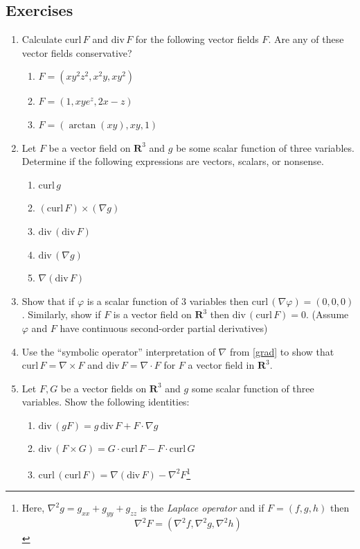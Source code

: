 \documentclass[12pt]{article}
\numberwithin{equation}{subsection}
\numberwithin{figure}{subsection}
\theoremstyle{note}
\newcommand{\curl}{\mathrm{curl\,}}
\newcommand{\dv}{\mathrm{div\,}}
\begin{document}
{\subsection{Exercises}
\begin{enumerate}[label=\arabic*.]


\item Calculate $\curl F$ and $\dv F$ for the following vector fields $F$. Are any of these vector fields conservative?

\begin{enumerate}
	\item $F=(xy^2z^2, x^2y, xy^2)$
	\item $F=(1, xye^z, 2x-z)$
	\item $F=(\arctan(xy), xy, 1)$
\end{enumerate}

\item Let $F$ be a vector field on $\mathbf{R}^3$ and $g$ be some scalar function of three variables. Determine if the following expressions are vectors, scalars, or nonsense. 

\begin{enumerate}
	\item $\curl g$
	\item $(\curl F) \times (\nabla g)$
	\item $\dv (\dv F)$
	\item $\dv (\nabla g)$
	\item $\nabla(\dv F)$
	\end{enumerate}
	
	\item Show that if $\varphi$ is a scalar function of $3$ variables then $\curl(\nabla \varphi)=(0,0,0)$. Similarly, show if $F$ is a vector field on $\mathbf{R}^3$ then $\dv(\curl F)=0$. (Assume $\varphi$ and $F$ have continuous second-order partial derivatives)

\item Use the ``symbolic operator'' interpretation of $\nabla$ from \eqref{grad} to show that $\curl F= \nabla \times F$ and $\dv F= \nabla \cdot F$ for $F$ a vector field in $\mathbf{R}^3$.

\item  Let $F,G$ be a vector fields on $\mathbf{R}^3$ and $g$ some scalar function of three variables. Show the following identities:

\begin{enumerate}
	\item $\dv (gF)=g \,\dv F + F\cdot \nabla g$
	\item $\dv (F\times G)=G \cdot \curl F - F \cdot \curl G$
	\item $\curl( \curl F)=\nabla (\dv F) - \nabla^2 F$\footnote{Here, $\nabla^2 g= g_{xx}+g_{yy}+g_{zz}$ is the \textit{Laplace operator} and if $F=(f,g,h)$ then \[\nabla^2 F= (\nabla^2 f, \nabla^2 g, \nabla^2 h)\]}  


\end{enumerate}
\end{enumerate}}
\end{document}
